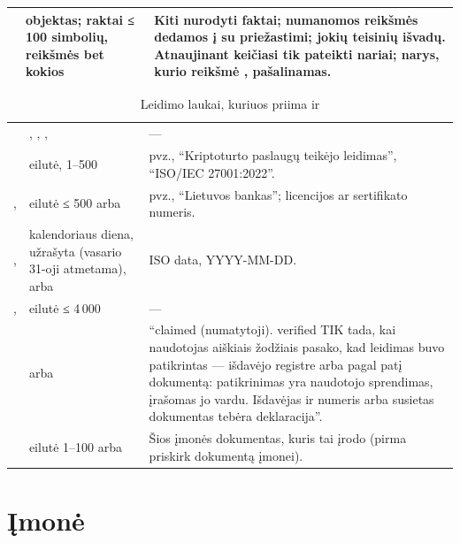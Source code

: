 \begin{table}[H]
\begin{tabularx}{\textwidth}{@{}L{39mm}L{43mm}Y@{}}
 & objektas; raktai ≤ 100 simbolių, reikšmės bet kokios & Kiti nurodyti faktai; numanomos reikšmės dedamos į  su priežastimi; jokių teisinių išvadų. Atnaujinant keičiasi tik pateikti nariai; narys, kurio reikšmė , pašalinamas. \\
\bottomrule
\end{tabularx}
\end{table}

\begin{table}[H]
\caption{Leidimo laukai, kuriuos priima  ir }\label{tab:tools:credfields}
\begin{tabularx}{\textwidth}{@{}L{39mm}L{43mm}Y@{}}
\toprule
{} &  &  \\
\midrule
{} & , , ,  & --- \\
 & eilutė, 1--500 & pvz., \enquote{Kriptoturto paslaugų teikėjo leidimas}, \enquote{ISO/IEC 27001:2022}. \\
,  & eilutė ≤ 500 arba  & pvz., \enquote{Lietuvos bankas}; licencijos ar sertifikato numeris. \\
,  & kalendoriaus diena, užrašyta  (vasario 31-oji atmetama), arba  & ISO data, YYYY-MM-DD. \\
,  & eilutė ≤ 4\,000 & --- \\
 &  arba  & \enquote{claimed (numatytoji). verified TIK tada, kai naudotojas aiškiais žodžiais pasako, kad leidimas buvo patikrintas --- išdavėjo registre arba pagal patį dokumentą: patikrinimas yra naudotojo sprendimas, įrašomas jo vardu. Išdavėjas ir numeris arba susietas dokumentas tebėra deklaracija}. \\
 & eilutė 1--100 arba  & Šios įmonės dokumentas, kuris tai įrodo (pirma priskirk dokumentą įmonei). \\
\bottomrule
\end{tabularx}
\end{table}


\section{Įmonė}\label{sec:tools:company}


